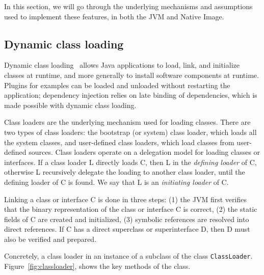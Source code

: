 In this section, we will go through the underlying mechanisms and assumptions used to implement these features, in both the JVM and Native Image.

\subsection{Dynamic class loading}
Dynamic class loading~\cite{liang_dynamic_nodate} allows Java applications to load, link, and initialize classes at runtime, and more generally to install software components at runtime. Plugins for examples can be loaded and unloaded without restarting the application; dependency injection relies on late binding of dependencies, which is made possible with dynamic class loading. 

Class loaders are the underlying mechanism used for loading classes. 
There are two types of class loaders: the bootstrap (or system) class loader, which loads all the system classes, and user-defined class loaders, which load classes from user-defined sources.
Class loaders operate on a delegation model for loading classes or interfaces. If a class loader L directly loads C, then L in the \textit{defining loader} of C, otherwise L recursively delegate the loading to another class loader, until the defining loader of C is found. We say that L is an \textit{initiating loader} of C. 

Linking a class or interface C is done in three steps: (1) the JVM first verifies that the binary representation of the class or interface C is correct, (2) the static fields of C are created and initialized, (3) symbolic references are resolved into direct references. If C has a direct superclass or superinterface D, then D must also be verified and prepared. 

Concretely, a class loader in an instance of a subclass of the class \verb|ClassLoader|. 
Figure~\ref{fig:classloader}, shows the key methods of the class.

